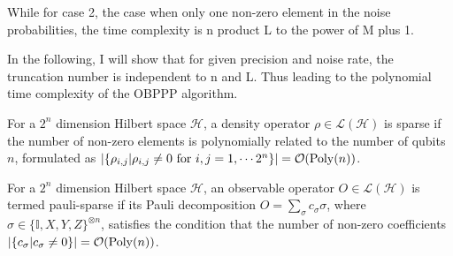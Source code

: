\documentclass[10pt]{beamer}
\begin{document}
\begin{CJK}{UTF8}{gbsn}
{ While for case 2, the case when only one non-zero element in the noise probabilities, the time complexity is n product L to the power of M plus 1.

 In the following, I will show that for given precision and noise rate, the truncation number is independent to n and L. Thus leading to the polynomial time complexity of the OBPPP algorithm.


  \begin{mdframed}
    \begin{definition}
 For a $2^n$ dimension Hilbert space $\mathcal{H}$, a density operator $\rho\in \mathcal{L}(\mathcal{H})$ is sparse if the number of non-zero elements is polynomially related to the number of qubits $n$, formulated as $\abs{\{\rho_{i,j}|\rho_{i,j}\neq 0 \text{ for }i,j=1,\cdots 2^n\}}=\order{\mathrm{Poly}(n)}$. 
    \end{definition}
    \begin{definition}
 For a $2^n$ dimension Hilbert space $\mathcal{H}$,
 an observable operator $O\in \mathcal{L}(\mathcal{H})$ is termed pauli-sparse if its Pauli decomposition $O=\sum_{\sigma}c_{\sigma}\sigma$, where $\sigma\in\{\mathbb{I},X,Y,Z\}^{\otimes n}$, satisfies the condition that the number of non-zero coefficients $\abs{\{c_{\sigma}|c_{\sigma}\neq 0 \}}=\order{\mathrm{Poly}(n)}$.
    \end{definition}
  \end{mdframed}
}

\end{CJK}
\end{document}
